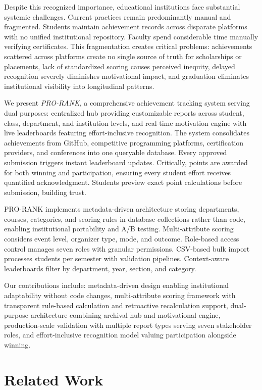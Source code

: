 \documentclass[conference]{IEEEtran}
\begin{document}
Despite this recognized importance, educational institutions face substantial systemic challenges. Current practices remain predominantly manual and fragmented. Students maintain achievement records across disparate platforms with no unified institutional repository. Faculty spend considerable time manually verifying certificates. This fragmentation creates critical problems: achievements scattered across platforms create no single source of truth for scholarships or placements, lack of standardized scoring causes perceived inequity, delayed recognition severely diminishes motivational impact, and graduation eliminates institutional visibility into longitudinal patterns.

We present \textit{PRO-RANK}, a comprehensive achievement tracking system serving dual purposes: centralized hub providing customizable reports across student, class, department, and institution levels, and real-time motivation engine with live leaderboards featuring effort-inclusive recognition. The system consolidates achievements from GitHub, competitive programming platforms, certification providers, and conferences into one queryable database. Every approved submission triggers instant leaderboard updates. Critically, points are awarded for both winning and participation, ensuring every student effort receives quantified acknowledgment. Students preview exact point calculations before submission, building trust.

PRO-RANK implements metadata-driven architecture storing departments, courses, categories, and scoring rules in database collections rather than code, enabling institutional portability and A/B testing. Multi-attribute scoring considers event level, organizer type, mode, and outcome. Role-based access control manages seven roles with granular permissions. CSV-based bulk import processes students per semester with validation pipelines. Context-aware leaderboards filter by department, year, section, and category.

Our contributions include: metadata-driven design enabling institutional adaptability without code changes, multi-attribute scoring framework with transparent rule-based calculation and retroactive recalculation support, dual-purpose architecture combining archival hub and motivational engine, production-scale validation with multiple report types serving seven stakeholder roles, and effort-inclusive recognition model valuing participation alongside winning.

\section{Related Work}
\end{document}
